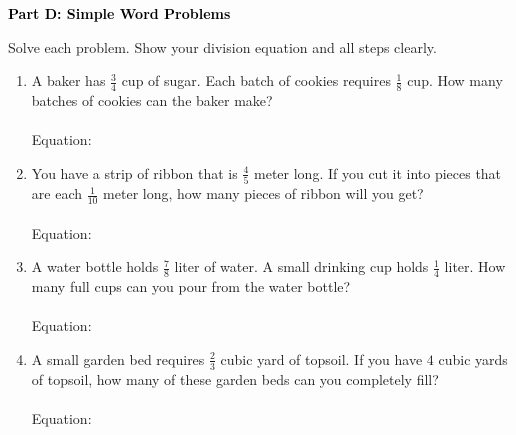 \documentclass[12pt, letterpaper, fleqn]{article}
\newcommand{\blanklong}{\underline{\hspace{6.5cm}}}
\begin{document}
\begin{tcolorbox}[colback=black!10]
    \large\textcolor{black}{\textbf{Part D: Simple Word Problems}}
\end{tcolorbox}

\vspace{3mm}
\noindent
Solve each problem. Show your division equation and all steps clearly.

\vspace{5mm}
\begin{enumerate}[itemsep=2cm, leftmargin=0.6cm]
\item A baker has $\frac{3}{4}$ cup of sugar. Each batch of cookies requires $\frac{1}{8}$ cup. How many batches of cookies can the baker make? \\ \\
Equation: \blanklong

\item You have a strip of ribbon that is $\frac{4}{5}$ meter long. If you cut it into pieces that are each $\frac{1}{10}$ meter long, how many pieces of ribbon will you get? \\ \\
Equation: \blanklong

\item A water bottle holds $\frac{7}{8}$ liter of water. A small drinking cup holds $\frac{1}{4}$ liter. How many full cups can you pour from the water bottle? \\ \\
Equation: \blanklong

\item A small garden bed requires $\frac{2}{3}$ cubic yard of topsoil. If you have $4$ cubic yards of topsoil, how many of these garden beds can you completely fill? \\ \\
Equation: \blanklong
\end{enumerate}
\end{document}
